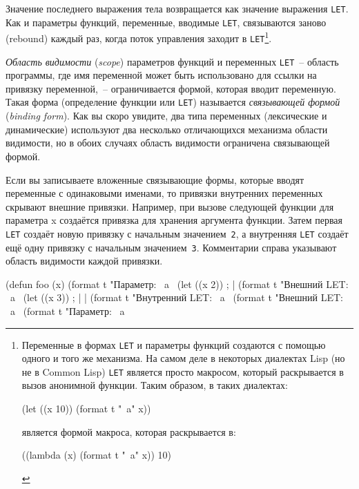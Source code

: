 Значение последнего выражения тела возвращается как значение выражения \lstinline{LET}. Как и
параметры функций, переменные, вводимые \lstinline{LET}, связываются заново (rebound) каждый
раз, когда поток управления заходит в \lstinline{LET}\footnote{Переменные в формах \lstinline{LET} и
параметры функций создаются с помощью одного и того же механизма. На самом деле в
некоторых диалектах Lisp (но не в Common Lisp) \lstinline{LET} является просто макросом,
который раскрывается в вызов анонимной функции. Таким образом, в таких диалектах:

\begin{myverb}
(let ((x 10)) (format t "~a" x))
\end{myverb}


\noindent{}является формой макроса, которая раскрывается в:

\begin{myverb}
((lambda (x) (format t "~a" x)) 10)
\end{myverb}
}\hspace{\footnotenegspace}.

\textit{Область видимости} (\textit{scope}) параметров функций и переменных
\lstinline{LET}~-- область программы, где имя переменной может быть использовано для ссылки
на привязку переменной,~-- ограничивается формой, которая вводит переменную. Такая форма
(определение функции или \lstinline{LET}) называется \textit{связывающей формой}
(\textit{binding form}). Как вы скоро увидите, два типа переменных (лексические и
динамические) используют два несколько отличающихся механизма области видимости, но в
обоих случаях область видимости ограничена связывающей формой.

Если вы записываете вложенные связывающие формы, которые вводят переменные с одинаковыми
именами, то привязки внутренних переменных скрывают внешние привязки. Например, при вызове
следующей функции для параметра x создаётся привязка для хранения аргумента функции. Затем
первая \lstinline{LET} создаёт новую привязку с начальным значением~\lstinline{2}, а внутренняя
\lstinline{LET} создаёт ещё одну привязку с начальным значением~\lstinline{3}. Комментарии справа
указывают область видимости каждой привязки.

\begin{myverb}
(defun foo (x)
  (format t "Параметр: ~a~%
  (let ((x 2))                             ; |
    (format t "Внешний LET: ~a~%
    (let ((x 3))                           ; | |
      (format t "Внутренний LET: ~a~%
    (format t "Внешний LET: ~a~%
  (format t "Параметр: ~a~%
\end{myverb}


